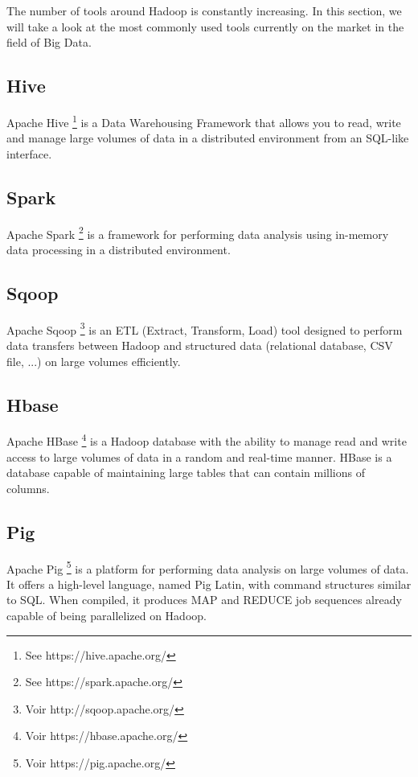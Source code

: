 \documentclass[12pt,english]{book}
\begin{document}

The number of tools around Hadoop is constantly increasing. In this section, we will take a look at the most commonly used tools currently on the market in the field of Big Data.


\subsection{Hive}

Apache Hive \footnote{See https://hive.apache.org/} is a Data Warehousing Framework that allows you to read, write and manage large volumes of data in a distributed environment from an SQL-like interface.

\subsection{Spark}

Apache Spark \footnote{See https://spark.apache.org/} is a framework for performing data analysis using in-memory data processing in a distributed environment.

\subsection{Sqoop}

Apache Sqoop \footnote{Voir http://sqoop.apache.org/} is an ETL (Extract, Transform, Load) tool designed to perform data transfers between Hadoop and structured data (relational database, CSV file, ...) on large volumes efficiently.  

\subsection{Hbase}

Apache HBase \footnote{Voir https://hbase.apache.org/} is a Hadoop database with the ability to manage read and write access to large volumes of data in a random and real-time manner. HBase is a database capable of maintaining large tables that can contain millions of columns.    

\subsection{Pig}

Apache Pig \footnote{Voir https://pig.apache.org/} is a platform for performing data analysis on large volumes of data. It offers a high-level language, named Pig Latin, with command structures similar to SQL. When compiled, it produces MAP and REDUCE job sequences already capable of being parallelized on Hadoop.
\end{document}
